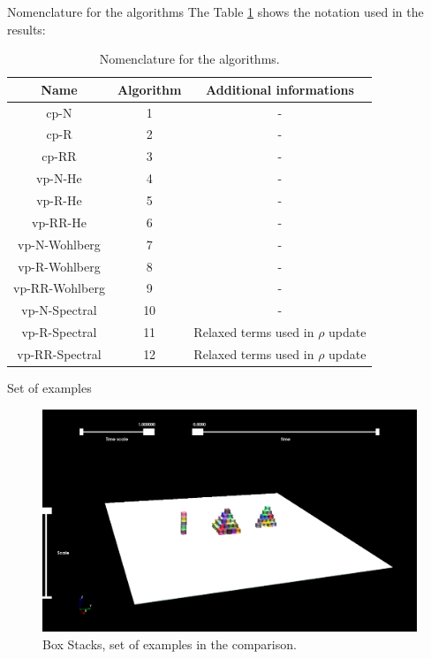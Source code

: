 \documentclass[8pt,red]{beamer}
\theoremstyle{plain}
\theoremstyle{definition}
\theoremstyle{remark}
\begin{document}
\begin{frame}{Nomenclature for the algorithms}
The Table \ref{Table:1} shows the notation used in the results:

\begin{table}[h!]
\centering
 \begin{tabular}{||c c c||} 
 \hline
 Name & Algorithm & Additional informations \\ [0.5ex] 
 \hline\hline
 cp-N & 1 & - \\ 
 \hline
 cp-R & 2 & - \\
 \hline
 cp-RR & 3 & - \\
 \hline
 vp-N-He & 4 & - \\
 \hline
 vp-R-He & 5 & - \\
 \hline
 vp-RR-He & 6 & - \\
 \hline
 vp-N-Wohlberg & 7 & - \\
 \hline
 vp-R-Wohlberg & 8 & - \\
 \hline
 vp-RR-Wohlberg & 9 & - \\
 \hline
 vp-N-Spectral & 10 & - \\
 \hline
 vp-R-Spectral & 11 & Relaxed terms used in $\rho$ update \\
 \hline
 vp-RR-Spectral & 12 & Relaxed terms used in $\rho$ update \\ [1ex] 
 \hline
\end{tabular}
\caption{Nomenclature for the algorithms.}
\label{Table:1}
\end{table}
\end{frame}

\begin{frame}{Set of examples}
\begin{figure}[hbtp]
\centering
\includegraphics[scale=0.2]{Results/Example/cubes.png}
\caption{Box Stacks, set of examples in the comparison.}
\end{figure}
\end{frame}
\end{document}

